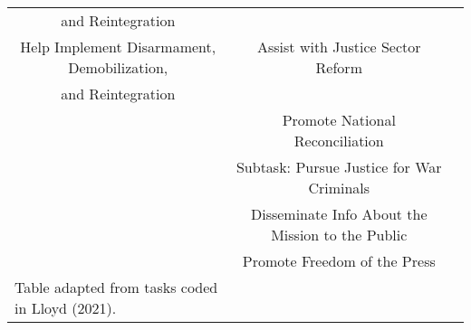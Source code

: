 \begin{table}[t]
\begin{tabular}{c*{2}{c}}
 and Reintegration                                      & \\
[0.5em]
Help Implement Disarmament, Demobilization,             & Assist with Justice Sector Reform \\ 
and Reintegration                                       & \\
[0.5em]
                                                        & Promote National Reconciliation \\
                                                        & Subtask: Pursue Justice for War Criminals \\
[0.5em]
                                                        & Disseminate Info About the Mission to the Public \\
[0.5em]
                                                        & Promote Freedom of the Press \\                                                                            
\hline\hline
\multicolumn{1}{l}{\footnotesize Table adapted from tasks coded in Lloyd (2021).}\\
\end{tabular}
\end{table}

